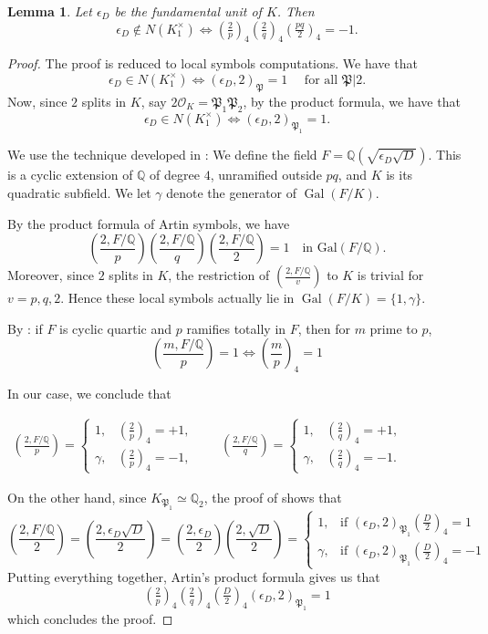 \documentclass{article}
\numberwithin{equation}{section}
\theoremstyle{plain}  %
\newtheorem{lemma}{Lemma}[section]
\theoremstyle{definition}
\newcommand{\Q}{\mathbb{Q}}
\newcommand{\ot}{\mathcal{O}}
\newcommand{\kron}[2]{\left( \tfrac{#1}{#2} \right)}
\DeclareMathOperator{\Gal}{Gal}
\newcommand{\fk}{\mathfrak }
\begin{document}
\begin{lemma} \label{lem: ed is norm iff}
    Let $\epsilon_D$ be the fundamental unit of $K$. Then $$\epsilon_D \notin N(K_1^\times) \iff \kron{2}{p}_4 \kron{2}{q}_4 \kron{pq}{2}_4 =-1.$$
\end{lemma}

\begin{proof}
    The proof is reduced to local symbols computations. We have that 
    $$\epsilon_D \in N(K_1^\times) \iff (\epsilon_D,2)_\fk P =1 \quad \text{ for all } \fk P | 2.$$  Now, since $2$ splits in $K$, say $2\ot_K = \fk P_1 \fk P_2$, by the product formula, we have that 
    $$\epsilon_D \in N(K_1^\times) \iff (\epsilon_D,2)_{\fk P_1} = 1. $$

    We use the technique developed in \cite{MR4940532}: We define the field $F=\Q(\sqrt{\epsilon_D \sqrt{D}})$. This is a cyclic extension of $\Q$ of degree $4$, unramified outside $pq$, and $K$ is its quadratic subfield. We let $\gamma$ denote the generator of $\Gal(F/K)$. 

    By the product formula of Artin symbols, we have
    $$ \left(\frac{2,F/\Q}{p}\right)\left(\frac{2,F/\Q}{q}\right)\left(\frac{2,F/\Q}{2}\right)=1
\quad\text{in }\mathrm{Gal}(F/ \Q). $$ 
Moreover, since $2$ splits in $K$, the restriction of $\left(\frac{2,F/\mathbb Q}{v}\right)$ to $K$ is trivial for $v=p,q,2$. Hence these local symbols actually lie in $\Gal(F/K)=\{1,\gamma\}$. 

By \cite[Lemma~4]{MR4940532} : if $F$ is cyclic quartic and $p$ ramifies totally in $F$, then for $m$ prime to $p$, 
$$\left(\frac{m,F/\Q}{p}\right)=1
\iff \left(\frac mp\right)_4=1$$

In our case, we conclude that 

$\begin{array}{c} \left(\frac{2,F/\Q}{p}\right)=
\begin{cases}
1,&\left(\frac2p\right)_4=+1,\\
\gamma,&\left(\frac2p\right)_4=-1,
\end{cases}
\qquad
\left(\frac{2,F/\Q}{q}\right)=
\begin{cases}
1,&\left(\frac2q\right)_4=+1,\\
\gamma,&\left(\frac2q\right)_4=-1.
\end{cases} \end{array}$

On the other hand, since $K_{\fk P_1} \simeq \mathbb Q_2$, the proof of \cite[Proposition~8]{MR4940532} shows that 
 $$\left( \frac{2, F/\Q}{2} \right) =\left( \frac{2, \epsilon_D \sqrt{D}}{2} \right) = \left( \frac{2, \epsilon_D}{2} \right) \left( \frac{2, \sqrt{D}}{2} \right)= \begin{cases}
1, & \text{if } (\epsilon_D,2)_{\fk P_1}\kron{D}{2}_4=1 \\
\gamma, & \text{if } (\epsilon_D,2)_{\fk P_1}\kron{D}{2}_4=-1
\end{cases}$$
Putting everything together, Artin's product formula gives us that 
$$\kron{2}{p}_4 \kron{2}{q}_4 \kron{D}{2}_4 (\epsilon_D,2)_{\fk P_1} =1$$
which concludes the proof.


\end{proof}
\end{document}
